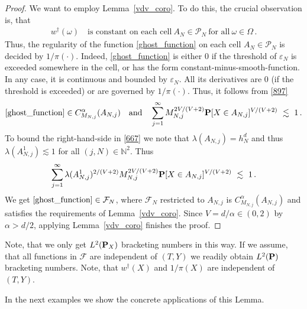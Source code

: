\begin{proof}
  We want to employ Lemma~\ref{vdv_coro}. 
  To do this, the crucial observation is, that
  \begin{gather*}
    w^\dagger(\omega)
    \quad
    \text{is constant on each cell}\ 
    A_N\in\mathcal{P}_N
    \ \text{for all}\ \omega\in\Omega
    \,.
  \end{gather*}
  Thus, the regularity of the function \eqref{ghost_function}
  on each cell $A_N\in\mathcal{P}_N$ is decided by 
  $1/\pi(\cdot)$.
  Indeed, \eqref{ghost_function} is either 0 if the threshold of $\varepsilon_N$ is exceeded somewhere in the cell, or has the form constant-minus-smooth-function.
In any case, it is continuous and bounded by $\varepsilon_N$.
All its derivatives are 0 (if the threshold is exceeded) or are governed by $1/\pi(\cdot)$.
Thus, it follows from \eqref{897}
\begin{gather}
  \eqref{ghost_function}
  \in C^\alpha_{M_{N,j}}(A_{N,j})
  \quad
  \text{and}
  \quad
  \sum_{j=1}^{\infty} 
  M_{N,j}^{2V/(V+2)}
  \P
  [
  X\in A_{N,j}
  ]^{V/(V+2)}
  \ 
  \lesssim
  \ 
  1
  \,.
\end{gather}
To bound the right-hand-side in \eqref{667} we note
that 
$
\lambda(A_{N,j})=h^d_N
$ 
and thus
$
\lambda(A_{N,j}^1)\lesssim 1
$
for all $(j,N)\in\mathbb{N}^2$.
Thus
\begin{gather*}
  \sum_{j=1}^{\infty} 
  \lambda(A_{N,j}^1)^{2/(V+2)}
  M_{N,j}^{2V/(V+2)}
  \P
  [
  X\in A_{N,j}
  ]^{V/(V+2)}
  \ 
  \lesssim
  \ 
  1
  \,.
\end{gather*}
We get $\eqref{ghost_function}\in\mathcal{F}_N$, where 
$
\mathcal{F}_N
$
restricted to $A_{N,j}$ is 
$
  C^\alpha_{M_{N,j}}(A_{N,j})
$
and satisfies the requirements of Lemma~\ref{vdv_coro}.
Since $V=d/\alpha \in (0,2)$ by $\alpha>d/2$, 
applying Lemma~\ref{vdv_coro} finishes the proof.
\end{proof}
\begin{remark}
  Note, that we only get $L^2(\P_X)$ bracketing numbers in this way. If we assume, that all functions in $\mathcal{F}$ are independent of $(T,Y)$
  we readily obtain $L^2(\P)$ bracketing numbers. Note, that $w^\dagger(X)$ and $1/\pi(X)$ are independent of $(T,Y)$.  
\end{remark}
In the next examples we show the concrete applications of this Lemma.
